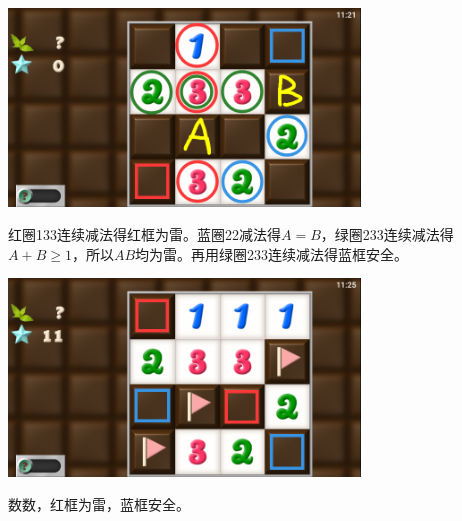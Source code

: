 \subsection{} %
\begin{center}
    \includegraphics[width=0.7\textwidth]{puzzle/164-1.png}
\end{center}
红圈133连续减法得红框为雷。蓝圈22减法得$A=B$，绿圈233连续减法得$A+B\ge 1$，所以$AB$均为雷。再用绿圈233连续减法得蓝框安全。
\begin{center}
    \includegraphics[width=0.7\textwidth]{puzzle/164-2.png}
\end{center}
数数，红框为雷，蓝框安全。

